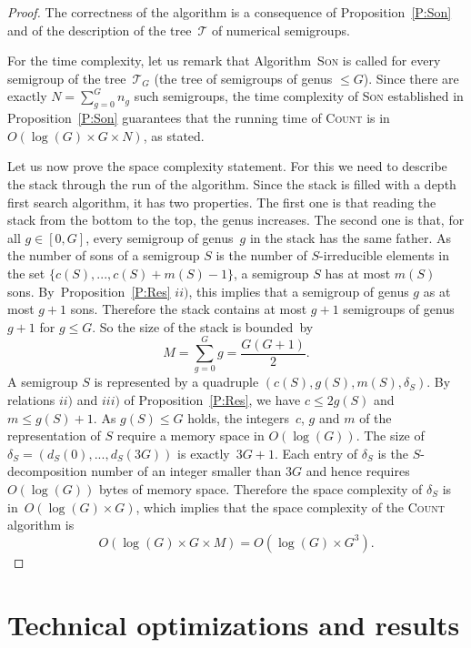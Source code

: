 \documentclass[reqno]{amsart}
\theoremstyle{plain}
\theoremstyle{definition}
\renewcommand{\leq}{\leqslant}
\begin{document}
\begin{proof}
The correctness of the algorithm is a consequence of Proposition~\ref{P:Son} and of the description of the tree~$\mathcal{T}$ of numerical semigroups.

For the time complexity, let us remark that Algorithm~\textsc{Son} is called for every semigroup of the tree~$\mathcal{T}_G$ (the tree of semigroups of genus $\leq G$). 
Since there are exactly $N=\sum_{g=0}^G n_g$ such semigroups, the time complexity of \textsc{Son} established in Proposition~\ref{P:Son} guarantees that the running time of \textsc{Count} is in~$O(\log(G)\times G\times N)$, as stated.

Let us now prove the space complexity statement.
For  this we need to describe the stack through  the run of the algorithm.
Since the stack is filled  with a depth first search algorithm, it has two properties.
The first one is that reading the stack from the bottom to the top, the genus increases.  
The second one is that, for all $g\in[0,G]$, every semigroup of genus~$g$ in the stack has the same father.
As the number of sons of a  semigroup $S$ is the number of $S$-irreducible elements in the set $\{c(S),...,c(S)+m(S)-1\}$,  a semigroup $S$ has at most $m(S)$ sons. 
By~Proposition~\ref{P:Res} $ii)$, this implies that a semigroup of genus $g$ as at most $g+1$ sons.
Therefore the stack contains at most $g+1$ semigroups of genus $g+1$ for $g\leq G$. 
So the size of the stack is bounded~by 
\[
M=\sum_{g=0}^Gg=\frac{G(G+1)}2.
\]
A semigroup $S$ is represented by a quadruple $(c(S),g(S),m(S),\delta_S)$. 
By relations $ii)$ and $iii)$ of Proposition~\ref{P:Res}, we have $c\leq 2g(S)$ and $m\leq g(S)+1$. 
As $g(S)\leq G$ holds, the integers~$c$, $g$  and $m$ of the representation of $S$ require a memory space in $O(\log(G))$. 
The size of~$\delta_S=(d_S(0),...,d_S(3G))$ is exactly~$3G+1$. 
Each entry of $\delta_S$ is the $S$-decomposition number of an integer smaller than $3G$ and hence
requires $O(\log(G))$ bytes of memory space.
Therefore the space complexity of $\delta_S$ is in~$O(\log(G)\times G)$, which implies that the space complexity of the \textsc{Count} algorithm is
\[
O(\log(G)\times G\times M)= O(\log(G)\times G^3).
\]
\end{proof}

\section{Technical optimizations and results}

\label{S:Opti}
\end{document}

